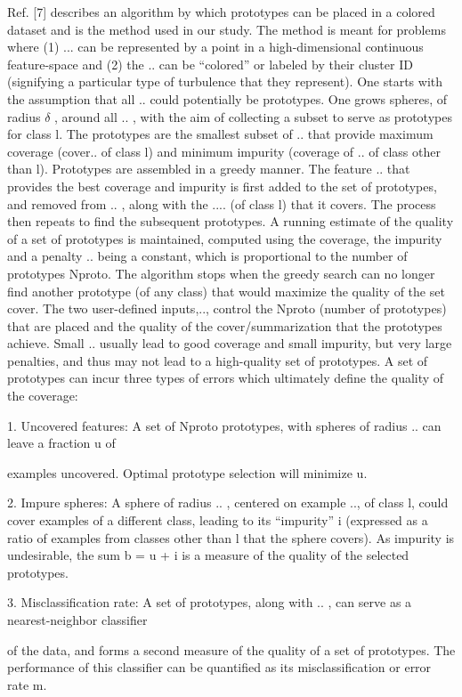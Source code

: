 Ref. [7] describes an algorithm by which prototypes can be placed in a colored dataset and is the method
used in our study. The method is meant for problems where (1) ... can be represented by a point in a
high-dimensional continuous feature-space and (2) the .. can be “colored” or labeled by their cluster ID
(signifying a particular type of turbulence that they represent). One starts with the assumption that all ..
could potentially be prototypes. One grows spheres, of radius $\delta$ , around all .. , with the aim of collecting a subset to serve as prototypes for class l. The prototypes are the smallest subset of .. that provide maximum coverage (cover.. of class l) and minimum impurity (coverage of .. of class other than l). Prototypes are assembled in a greedy manner. The feature .. that provides the best coverage and impurity is ﬁrst added to
the set of prototypes, and removed from .. , along with the .... (of class l) that it covers. The process then
repeats to ﬁnd the subsequent prototypes. A running estimate of the quality of a set of prototypes is
maintained, computed using the coverage, the impurity and a penalty .. being a constant, which
is proportional to the number of prototypes Nproto. The algorithm stops when the greedy search can no
longer ﬁnd another prototype (of any class) that would maximize the quality of the set cover. The two
user-deﬁned inputs,.., control the Nproto (number of prototypes) that are placed and the quality of
the cover/summarization that the prototypes achieve. Small .. usually lead to good coverage and small
impurity, but very large penalties, and thus may not lead to a high-quality set of prototypes. A set of
prototypes can incur three types of errors which ultimately deﬁne the quality of the coverage:

1. Uncovered features: A set of Nproto prototypes, with spheres of radius .. can leave a fraction u of

examples uncovered. Optimal prototype selection will minimize u.

2. Impure spheres: A sphere of radius .. , centered on example .., of class l, could cover examples of a
different class, leading to its “impurity” i (expressed as a ratio of examples from classes other than l
that the sphere covers). As impurity is undesirable, the sum b = u + i is a measure of the quality of
the selected prototypes.

3. Misclassiﬁcation rate: A set of prototypes, along with .. , can serve as a nearest-neighbor classiﬁer

of the data, and forms a second measure of the quality of a set of prototypes. The performance of this
classiﬁer can be quantiﬁed as its misclassiﬁcation or error rate m.

